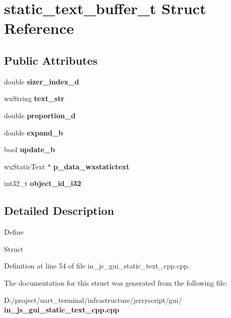 \section{static\+\_\+text\+\_\+buffer\+\_\+t Struct Reference}
\label{structstatic__text__buffer__t}
\subsection*{Public Attributes}
\begin{DoxyCompactItemize}
\item 
\mbox{\label{structstatic__text__buffer__t_ad3fa7d04333ec9cc64b75bcac829752b}} 
double {\bfseries sizer\+\_\+index\+\_\+d}
\item 
\mbox{\label{structstatic__text__buffer__t_aa1acfaa5020b329b6d2606987037ca8d}} 
wx\+String {\bfseries text\+\_\+str}
\item 
\mbox{\label{structstatic__text__buffer__t_a87b86e1fd9608378843225f6ea885c6d}} 
double {\bfseries proportion\+\_\+d}
\item 
\mbox{\label{structstatic__text__buffer__t_aee984c6e9200876b0da7eb8acb43803b}} 
double {\bfseries expand\+\_\+b}
\item 
\mbox{\label{structstatic__text__buffer__t_a3965730c12c29d7dd81afeb6c573acef}} 
bool {\bfseries update\+\_\+b}
\item 
\mbox{\label{structstatic__text__buffer__t_abc4b1e15a40b1dd2880b6162d4521209}} 
wx\+Static\+Text $\ast$ {\bfseries p\+\_\+data\+\_\+wxstatictext}
\item 
\mbox{\label{structstatic__text__buffer__t_a121868e55ba2112e7a3ecfd2f70fd782}} 
int32\+\_\+t {\bfseries object\+\_\+id\+\_\+i32}
\end{DoxyCompactItemize}


\subsection{Detailed Description}
Define

Struct 

Definition at line 54 of file in\+\_\+js\+\_\+gui\+\_\+static\+\_\+text\+\_\+cpp.\+cpp.



The documentation for this struct was generated from the following file\+:\begin{DoxyCompactItemize}
\item 
D\+:/project/uart\+\_\+terminal/infrastructure/jerryscript/gui/\textbf{ in\+\_\+js\+\_\+gui\+\_\+static\+\_\+text\+\_\+cpp.\+cpp}\end{DoxyCompactItemize}
